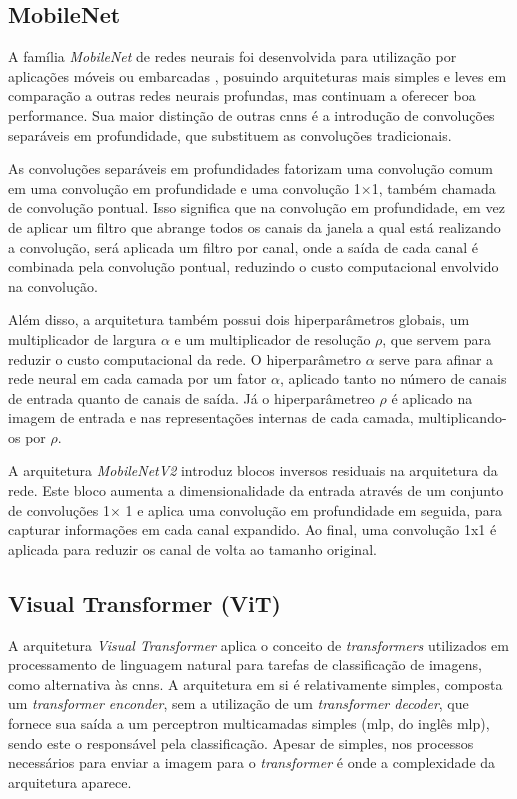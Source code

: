 \subsection{MobileNet}
A família \textit{MobileNet} de redes neurais foi desenvolvida para utilização por aplicações móveis ou embarcadas \cite{mobilenet}, 
posuindo arquiteturas mais simples e leves em comparação a outras redes neurais profundas, 
mas continuam a oferecer boa performance. Sua maior distinção de outras \acrshort{cnn}s é a introdução de convoluções separáveis em profundidade, que substituem as convoluções tradicionais.

As convoluções separáveis em profundidades fatorizam uma convolução comum em uma convolução em profundidade e uma convolução 1$\times$1, também chamada de convolução pontual. Isso significa que na convolução em profundidade, em vez de aplicar um filtro que abrange todos os canais da janela a qual está realizando a convolução, será aplicada um filtro por canal, onde a saída de cada canal é combinada pela convolução pontual, reduzindo o custo computacional envolvido na convolução.

Além disso, a arquitetura também possui dois hiperparâmetros globais, um multiplicador de largura $\alpha$ e um multiplicador de resolução $\rho$, que servem para reduzir o custo computacional da rede. O hiperparâmetro $\alpha$ serve para afinar a rede neural em cada camada por um fator $\alpha$, aplicado tanto no número de canais de entrada quanto de canais de saída. Já o hiperparâmetreo $\rho$ é aplicado na imagem de entrada e nas representações internas de cada camada, multiplicando-os por $\rho$.

A arquitetura \textit{MobileNetV2}\cite{mobilenetv2} introduz blocos inversos residuais na arquitetura da rede. Este bloco aumenta a dimensionalidade da entrada através de um conjunto de convoluções 1$\times$ 1 e aplica uma convolução em profundidade em seguida, para capturar informações em cada canal expandido. Ao final, uma convolução 1x1 é aplicada para reduzir os canal de volta ao tamanho original.

\subsection{Visual Transformer (ViT)}
A arquitetura \textit{Visual Transformer}\cite{vit} aplica o conceito de \textit{transformers}\cite{transformer2017} 
utilizados em processamento de linguagem natural para tarefas de classificação de imagens, como alternativa às \acrshort{cnn}s. 
A arquitetura em si é relativamente simples, composta um \textit{transformer enconder}, sem a utilização de um \textit{transformer decoder}, 
que fornece sua saída a um perceptron multicamadas simples (\acrshort{mlp}, do inglês \acrlong{mlp}), sendo este o responsável pela classificação. 
Apesar de simples, nos processos necessários para enviar a imagem para o \textit{transformer} é onde a complexidade da arquitetura aparece.

